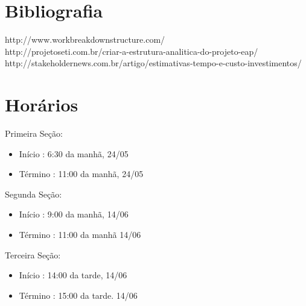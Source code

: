 \documentclass[12pt,a4paper,final]{report}
\begin{document}
\newpage
\section*{Bibliografia}
http://www.workbreakdownstructure.com/\\
http://projetoseti.com.br/criar-a-estrutura-analitica-do-projeto-eap/\\
http://stakeholdernews.com.br/artigo/estimativas-tempo-e-custo-investimentos/

\section*{Horários}
Primeira Seção:\\
\begin{itemize}
\item Início : 6:30 da manhã, 24/05
\item Término : 11:00 da manhã, 24/05
\end{itemize}
Segunda Seção:\\
\begin{itemize}
\item Início : 9:00 da manhã, 14/06
\item Término : 11:00 da manhã 14/06
\end{itemize}
Terceira Seção:\\
\begin{itemize}
\item Início : 14:00 da tarde, 14/06
\item Término : 15:00 da tarde. 14/06
\end{itemize}
\end{document}
